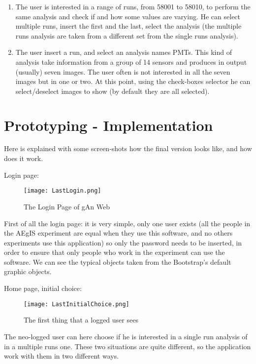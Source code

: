 \begin{enumerate}
\item
The user is interested in a range of runs, from 58001 to 58010, to perform the same analysis and check if and how some values are varying. He can select multiple runs, insert the first and the last, select the analysis (the multiple runs analysis are taken from a different set from the single runs analysis).

\item
The user insert a run, and select an analysis names PMTs. This kind of analysis take information from a group of 14 sensors and produces in output (usually) seven images. The user often is not interested in all the seven images but in one or two. At this point, using the check-boxes selector he can select/deselect images to show (by default they are all selected).  

\end{enumerate}

\newpage
\section{Prototyping - Implementation}

Here is explained with some screen-shots how the final version looks like, and how does it work.

Login page:


\begin{figure}[H]
\centering
\texttt{[image: LastLogin.png]} 
\caption{The Login Page of gAn Web}
\end{figure}

First of all the login page: it is very simple, only one user exists (all the people in the AEgIS experiment are equal when they use this software, and no others experiments use this application) so only the password needs to be inserted, in order to ensure that only people who work in the experiment can use the software. We can see the typical objects taken from the Bootstrap's default graphic objects.

\newpage

Home page, initial choice:

\begin{figure}[H]
\centering
\texttt{[image: LastInitialChoice.png]} 
\caption{The first thing that a logged user sees}
\end{figure}
  
The neo-logged user can here choose if he is interested in a single run analysis of in a multiple runs one. These two situations are quite different, so the application work with them in two different ways.

